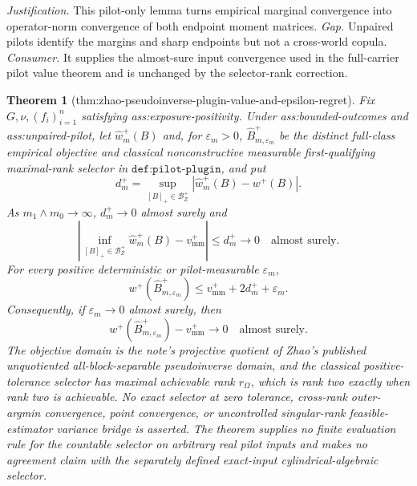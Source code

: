 \documentclass{article}
\newtheorem{theorem}{Theorem}
\begin{document}
\par\smallskip\noindent \textit{Justification.} This pilot-only lemma turns empirical marginal convergence into operator-norm convergence of both endpoint moment matrices. \textit{Gap.} Unpaired pilots identify the margins and sharp endpoints but not a cross-world copula. \textit{Consumer.} It supplies the almost-sure input convergence used in the full-carrier pilot value theorem and is unchanged by the selector-rank correction.

\begin{theorem}[thm:zhao-pseudoinverse-plugin-value-and-epsilon-regret]\label{thm:zhao-pseudoinverse-plugin-value-and-epsilon-regret}
Fix \(G,\nu,(f_i)_{i=1}^n\) satisfying ass:exposure-positivity.  Under ass:bounded-outcomes and ass:unpaired-pilot, let \(\widehat w_m^+(B)\) and, for \(\varepsilon_m>0\), \(\widehat B_{m,\varepsilon_m}^+\) be the distinct full-class empirical objective and classical nonconstructive measurable first-qualifying maximal-rank selector in \(\texttt{def:pilot-plugin}\), and put
\[
d_m^+=\sup_{[B]_+\in\mathcal B_Z^+}|\widehat w_m^+(B)-w^+(B)|.
\]
As \(m_1\wedge m_0\to\infty\), \(d_m^+\to0\) almost surely and
\[
\left|\inf_{[B]_+\in\mathcal B_Z^+}\widehat w_m^+(B)-v_{\mathrm{mm}}^+\right|
\le d_m^+\longrightarrow0
\quad\text{almost surely}.
\]
For every positive deterministic or pilot-measurable \(\varepsilon_m\),
\[
w^+(\widehat B_{m,\varepsilon_m}^+)
\le v_{\mathrm{mm}}^++2d_m^++\varepsilon_m.
\]
Consequently, if \(\varepsilon_m\to0\) almost surely, then
\[
w^+(\widehat B_{m,\varepsilon_m}^+)-v_{\mathrm{mm}}^+\longrightarrow0
\quad\text{almost surely}.
\]
The objective domain is the note's projective quotient of Zhao's published unquotiented all-block-separable pseudoinverse domain, and the classical positive-tolerance selector has maximal achievable rank \(r_\Omega\), which is rank two exactly when rank two is achievable.  No exact selector at zero tolerance, cross-rank outer-argmin convergence, point convergence, or uncontrolled singular-rank feasible-estimator variance bridge is asserted.  The theorem supplies no finite evaluation rule for the countable selector on arbitrary real pilot inputs and makes no agreement claim with the separately defined exact-input cylindrical-algebraic selector.
\end{theorem}
\end{document}
